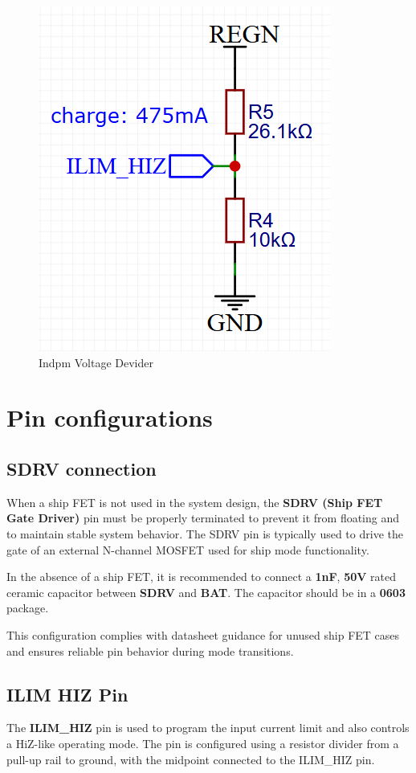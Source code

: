 \documentclass[12pt]{article}
\begin{document}
\begin{figure}[H]
    \centering
    \includegraphics[width=.4\linewidth]{Iset-BQ25798-voltage-devider.PNG}
    \caption{Indpm Voltage Devider}
    \label{img:Iset-BQ25798-voltage-devider}
\end{figure}

\section{Pin configurations}
\subsection{SDRV connection}
When a ship FET is not used in the system design, the \textbf{SDRV (Ship FET Gate Driver)} pin must be properly terminated to prevent it from floating and to maintain stable system behavior. The SDRV pin is typically used to drive the gate of an external N-channel MOSFET used for ship mode functionality.

In the absence of a ship FET, it is recommended to connect a \textbf{1nF}, \textbf{50V} rated ceramic capacitor between \textbf{SDRV} and \textbf{BAT}. The capacitor should be in a \textbf{0603} package.

This configuration complies with datasheet guidance for unused ship FET cases and ensures reliable pin behavior during mode transitions.

\subsection{ILIM HIZ Pin}
\label{sec:ILIM-HIZ}
The \textbf{ILIM\_HIZ} pin is used to program the input current limit and also controls a HiZ-like operating mode. The pin is configured using a resistor divider from a pull-up rail to ground, with the midpoint connected to the ILIM\_HIZ pin.
\end{document}
